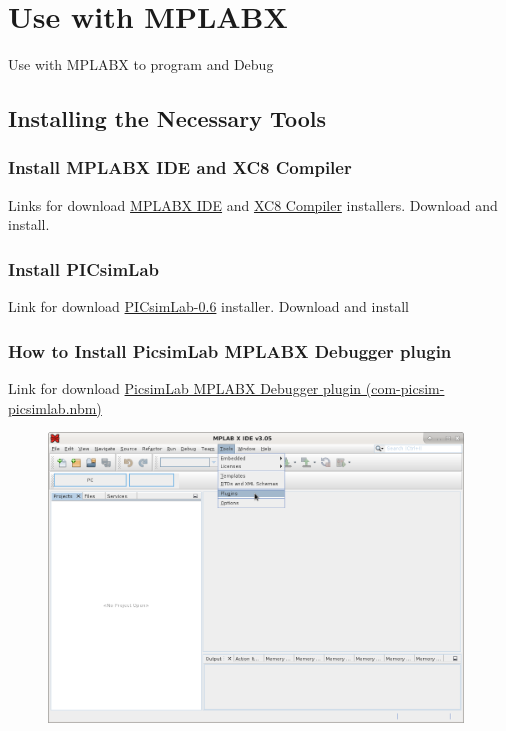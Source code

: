 \chapter{Use with MPLABX}

Use with MPLABX to program and Debug

\section{Installing the Necessary Tools}

\subsection{Install MPLABX IDE and XC8 Compiler}
Links for download  \href{http://www.microchip.com/mplabx}{MPLABX IDE} and \href{http://www.microchip.com/compilers}{XC8 Compiler} installers.
Download and install.

\subsection{Install PICsimLab}

Link for download \href{http://sourceforge.net/projects/picsim/files/picsim/picsim-0.6/}{PICsimLab-0.6} installer. 
Download and install

\subsection{How to Install PicsimLab MPLABX Debugger plugin}

Link for download \href{http://sourceforge.net/projects/picsim/files/picsim/picsim-0.6/}{PicsimLab MPLABX Debugger plugin (com-picsim-picsimlab.nbm)} 

\begin{figure}[H]
\center
\includegraphics[width=0.98\textwidth]{img/hmd/mplab01.png} 
\end{figure} 


